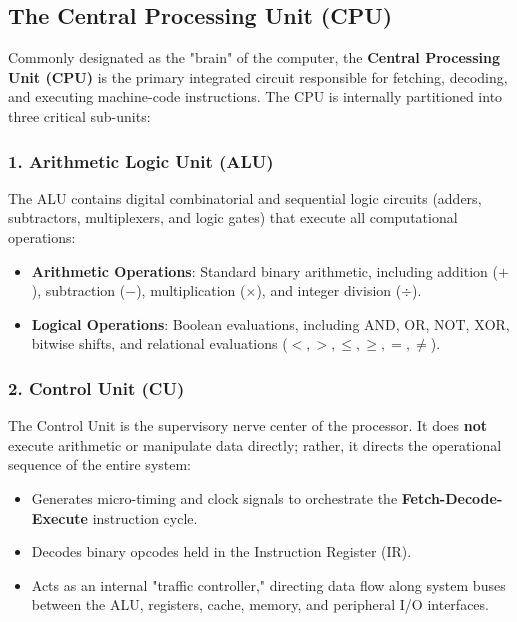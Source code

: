 \subsection{The Central Processing Unit (CPU)}

Commonly designated as the "brain" of the computer, the \textbf{Central Processing Unit (CPU)} is the primary integrated circuit responsible for fetching, decoding, and executing machine-code instructions. The CPU is internally partitioned into three critical sub-units:

\subsubsection{1. Arithmetic Logic Unit (ALU)}
The ALU contains digital combinatorial and sequential logic circuits (adders, subtractors, multiplexers, and logic gates) that execute all computational operations:
\begin{itemize}
    \item \textbf{Arithmetic Operations}: Standard binary arithmetic, including addition ($+$), subtraction ($-$), multiplication ($\times$), and integer division ($\div$).
    \item \textbf{Logical Operations}: Boolean evaluations, including $\text{AND}$, $\text{OR}$, $\text{NOT}$, $\text{XOR}$, bitwise shifts, and relational evaluations ($<, >, \le, \ge, =, \ne$).
\end{itemize}

\subsubsection{2. Control Unit (CU)}
The Control Unit is the supervisory nerve center of the processor. It does \textbf{not} execute arithmetic or manipulate data directly; rather, it directs the operational sequence of the entire system:
\begin{itemize}
    \item Generates micro-timing and clock signals to orchestrate the \textbf{Fetch-Decode-Execute} instruction cycle.
    \item Decodes binary opcodes held in the Instruction Register (IR).
    \item Acts as an internal "traffic controller," directing data flow along system buses between the ALU, registers, cache, memory, and peripheral I/O interfaces.
\end{itemize}

